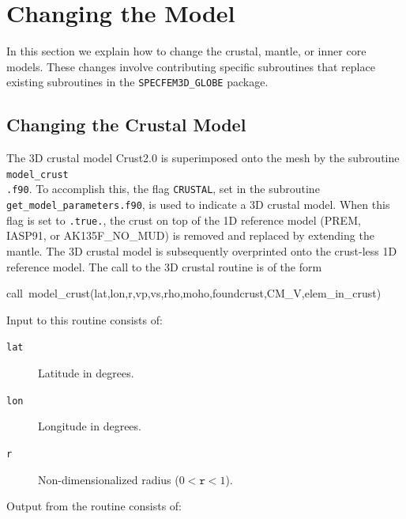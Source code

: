 \documentclass[oneside,english]{book}
\newenvironment{lyxcode}
{\begin{list}{}{
\setlength{\rightmargin}{\leftmargin}
\setlength{\listparindent}{0pt}%
\raggedright
\setlength{\itemsep}{0pt}
\setlength{\parsep}{0pt}
\normalfont\ttfamily}%
 \item[]}
{\end{list}}
\begin{document}
\chapter{{\normalsize \label{cha:-Changing-the}} Changing the Model}

In this section we explain how to change the crustal, mantle, or inner
core models. These changes involve contributing specific subroutines
that replace existing subroutines in the \texttt{SPECFEM3D\_GLOBE}
package.


\section{{\normalsize \label{sec:Changing-the-Crustal}}Changing the Crustal
Model}

The 3D crustal model Crust2.0 \citep{BaLaMa00} is superimposed onto
the mesh by the subroutine \texttt{model\_crust}~\\
\texttt{.f90}. To accomplish this, the flag \texttt{CRUSTAL}, set
in the subroutine \texttt{get\_model\_parameters.f90}, is used
to indicate a 3D crustal model. When this flag is set to \texttt{.true.},
the crust on top of the 1D reference model (PREM, IASP91, or AK135F\_NO\_MUD)
is removed and replaced by extending the mantle. The 3D crustal model
is subsequently overprinted onto the crust-less 1D reference model.
The call to the 3D crustal routine is of the form

\begin{lyxcode}
call~model\_crust(lat,lon,r,vp,vs,rho,moho,foundcrust,CM\_V,elem\_in\_crust)
\end{lyxcode}
Input to this routine consists of:

\begin{description}
\item [{\texttt{lat}}] Latitude in degrees.
\item [{\texttt{lon}}] Longitude in degrees.
\item [{\texttt{r}}] Non-dimensionalized radius ($0<\texttt{r}<1$).
\end{description}
Output from the routine consists of:
\end{document}
